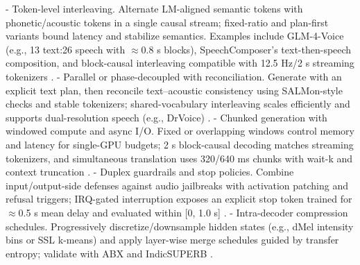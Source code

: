 \documentclass{article}
\begin{document}
- Token-level interleaving. Alternate LM-aligned semantic tokens with phonetic/acoustic tokens in a single causal stream; fixed-ratio and plan-first variants bound latency and stabilize semantics. Examples include GLM-4-Voice (e.g., 13 text:26 speech with $\approx$0.8 s blocks), SpeechComposer's text-then-speech composition, and block-causal interleaving compatible with 12.5 Hz/2 s streaming tokenizers \cite{zeng2024glm4voicetowardsintelligenthumanlikeends,wu2024speechcomposerunifyingmultiplespeechtask,zeng2024scalingspeechtextpretrainingsyntheticint,har-tuv2025pastphoneticacousticspeechtokenizer,jo2025lmsptalignedsemanticdistillationspeechto,vashishth2024stabspeechtokenizerassessmentbenchmark,cui2025thinkbeforeyoutalkenhancingmeaningfuldia}.
- Parallel or phase-decoupled with reconciliation. Generate with an explicit text plan, then reconcile text--acoustic consistency using SALMon-style checks and stable tokenizers; shared-vocabulary interleaving scales efficiently and supports dual-resolution speech (e.g., DrVoice) \cite{maimon2025scalinganalysisinterleavedspeechtextlang,maimon2025salmonsuiteacousticlanguagemodelevaluati,tan2025drvoiceparallelspeechtextvoiceconversati,vashishth2024stabspeechtokenizerassessmentbenchmark,wu2024speechcomposerunifyingmultiplespeechtask,zeng2024glm4voicetowardsintelligenthumanlikeends}.
- Chunked generation with windowed compute and async I/O. Fixed or overlapping windows control memory and latency for single-GPU budgets; 2 s block-causal decoding matches streaming tokenizers, and simultaneous translation uses 320/640 ms chunks with wait-k and context truncation \cite{zeng2024scalingspeechtextpretrainingsyntheticint,guo2025streamuniachievingstreamingspeechtransla,maimon2025slammingtrainingspeechlanguagemodelonegp,chen2023reducingbarriersselfsupervisedlearninghu}.
- Duplex guardrails and stop policies. Combine input/output-side defenses against audio jailbreaks with activation patching and refusal triggers; IRQ-gated interruption exposes an explicit stop token trained for $\approx$0.5 s mean delay and evaluated within [0, 1.0 s] \cite{peri2024speechguardexploringadversarialrobustnes,djanibekov2025spiritpatchingspeechlanguagemodelsagains,ma2024languagemodelcanlistenwhilespeaking}.
- Intra-decoder compression schedules. Progressively discretize/downsample hidden states (e.g., dMel intensity bins or SSL k-means) and apply layer-wise merge schedules guided by transfer entropy; validate with ABX and IndicSUPERB \cite{bai2025dmelspeechtokenizationmadesimple,onda2025benchmarkingprosodyencodingdiscretespeec,poli2025fastabxlibraryefficientcomputationabxdis,entry2025indicsuperbspeechprocessinguniversalperf,lu2024fastadaspmultitaskadaptedefficientinfere}.
\end{document}
